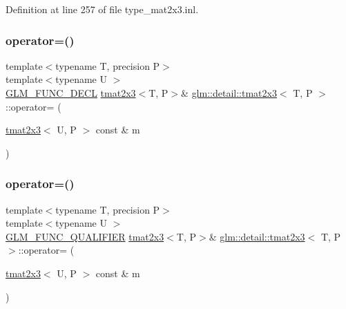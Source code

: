 Definition at line 257 of file type\+\_\+mat2x3.\+inl.

\mbox{\label{structglm_1_1detail_1_1tmat2x3_a449f7c79e1c6333dbc508656a698b4d9}} 
\subsubsection{\texorpdfstring{operator=()}{operator=()}\hspace{0.1cm}{\footnotesize\ttfamily [2/3]}}
{\footnotesize\ttfamily template$<$typename T, precision P$>$ \\
template$<$typename U $>$ \\
\hyperlink{setup_8hpp_ab2d052de21a70539923e9bcbf6e83a51}{G\+L\+M\+\_\+\+F\+U\+N\+C\+\_\+\+D\+E\+CL} \hyperlink{structglm_1_1detail_1_1tmat2x3}{tmat2x3}$<$T, P$>$\& \hyperlink{structglm_1_1detail_1_1tmat2x3}{glm\+::detail\+::tmat2x3}$<$ T, P $>$\+::operator= (\begin{DoxyParamCaption}\item[{\hyperlink{structglm_1_1detail_1_1tmat2x3}{tmat2x3}$<$ U, P $>$ const \&}]{m }\end{DoxyParamCaption})}

\mbox{\label{structglm_1_1detail_1_1tmat2x3_a1c28fce0a5ae7b18120851f7a44f9448}} 
\subsubsection{\texorpdfstring{operator=()}{operator=()}\hspace{0.1cm}{\footnotesize\ttfamily [3/3]}}
{\footnotesize\ttfamily template$<$typename T, precision P$>$ \\
template$<$typename U $>$ \\
\hyperlink{setup_8hpp_a33fdea6f91c5f834105f7415e2a64407}{G\+L\+M\+\_\+\+F\+U\+N\+C\+\_\+\+Q\+U\+A\+L\+I\+F\+I\+ER} \hyperlink{structglm_1_1detail_1_1tmat2x3}{tmat2x3}$<$T, P$>$\& \hyperlink{structglm_1_1detail_1_1tmat2x3}{glm\+::detail\+::tmat2x3}$<$ T, P $>$\+::operator= (\begin{DoxyParamCaption}\item[{\hyperlink{structglm_1_1detail_1_1tmat2x3}{tmat2x3}$<$ U, P $>$ const \&}]{m }\end{DoxyParamCaption})}



